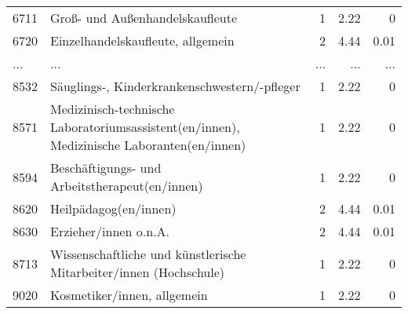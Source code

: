 \begin{longtable}{lXrrr}
        6711 & \multicolumn{1}{X}{Groß- und Außenhandelskaufleute} & %
          \num{1} &
          \num[round-mode=places,round-precision=2]{2,22} &
          \num[round-mode=places,round-precision=2]{0} \\
        6720 & \multicolumn{1}{X}{Einzelhandelskaufleute, allgemein} & %
          \num{2} &
          \num[round-mode=places,round-precision=2]{4,44} &
          \num[round-mode=places,round-precision=2]{0,01} \\
       ... & ... & ... & ... & ... \\
        8532 & \multicolumn{1}{X}{Säuglings-, Kinderkrankenschwestern/-pfleger} & %
          \num{1} &
          \num[round-mode=places,round-precision=2]{2,22} &
          \num[round-mode=places,round-precision=2]{0} \\

        8571 & \multicolumn{1}{X}{Medizinisch-technische Laboratoriumsassistent(en/innen), Medizinische Laboranten(en/innen)} & %
          \num{1} &
          \num[round-mode=places,round-precision=2]{2,22} &
          \num[round-mode=places,round-precision=2]{0} \\

        8594 & \multicolumn{1}{X}{Beschäftigungs- und Arbeitstherapeut(en/innen)} & %
          \num{1} &
          \num[round-mode=places,round-precision=2]{2,22} &
          \num[round-mode=places,round-precision=2]{0} \\

        8620 & \multicolumn{1}{X}{Heilpädagog(en/innen)} & %
          \num{2} &
          \num[round-mode=places,round-precision=2]{4,44} &
          \num[round-mode=places,round-precision=2]{0,01} \\

        8630 & \multicolumn{1}{X}{Erzieher/innen o.n.A.} & %
          \num{2} &
          \num[round-mode=places,round-precision=2]{4,44} &
          \num[round-mode=places,round-precision=2]{0,01} \\

        8713 & \multicolumn{1}{X}{Wissenschaftliche und künstlerische Mitarbeiter/innen (Hochschule)} & %
          \num{1} &
          \num[round-mode=places,round-precision=2]{2,22} &
          \num[round-mode=places,round-precision=2]{0} \\

        9020 & \multicolumn{1}{X}{Kosmetiker/innen, allgemein} & %
          \num{1} &
          \num[round-mode=places,round-precision=2]{2,22} &
          \num[round-mode=places,round-precision=2]{0} \\


\end{longtable}
